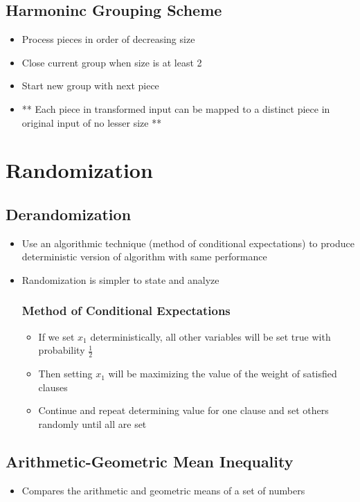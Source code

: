 \subsection{Harmoninc Grouping Scheme}
\begin{itemize}
	\item Process pieces in order of decreasing size
	\item Close current group when size is at least 2
	\item Start new group with next piece
	\item ** Each piece in transformed input can be mapped to a distinct piece in original input of no lesser size **
\end{itemize}
\section{Randomization}
\subsection{Derandomization}
\begin{itemize}
	\item Use an algorithmic technique (method of conditional expectations) to produce deterministic version of algorithm with same performance
	\item Randomization is simpler to state and analyze
	\subsubsection{Method of Conditional Expectations}
	\begin{itemize}
		\item If we set $x_{1}$ deterministically, all other variables will be set true with probability $\frac{1}{2}$
		\item Then setting $x_{1}$ will be maximizing the value of the weight of satisfied clauses
		\item Continue and repeat determining value for one clause and set others randomly until all are set
	\end{itemize}
\end{itemize}
\subsection{Arithmetic-Geometric Mean Inequality}
\begin{itemize}
	\item Compares the arithmetic and geometric means of a set of numbers
\end{itemize}
